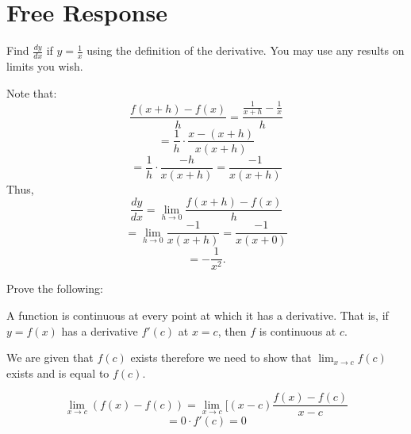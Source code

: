 \section{Free Response}
\begin{questions}

\question[10] Find $\frac{dy}{dx}$ if $y = \frac{1}{x}$ using the
    definition of the derivative. You may use any results on limits
    you wish.

    \begin{solution}
        Note that:
        $$\frac{ f(x+h) - f(x) }{ h } = \frac{ \frac{1}{x+h}
          - \frac{1}{x} }{h}$$
        $$= \frac{1}{h} \cdot \frac{x - (x + h)}{x(x+h)}$$
        $$= \frac{1}{h} \cdot \frac{-h}{x(x+h)} = \frac{-1}{x(x+h)}$$
        Thus,
        $$\frac{dy}{dx} = \lim_{h \to 0} \frac{f(x+h) - f(x)}{h} $$
        $$ = \lim_{h \to 0} \frac{-1}{x(x+h)} = \frac{-1}{x(x+0)} $$
        $$ = -\frac{1}{x^2}.$$
    \end{solution}

\question[10] Prove the following:
              \begin{theorem}
                  A function is continuous at every point at which it
                  has a derivative. That is, if $y = f(x)$ has a
                  derivative $f'(c)$ at $x = c$, then $f$ is
                  continuous at $c$.
              \end{theorem}

    \begin{solution}
        We are given that $f(c)$ exists therefore we need to show that
        $\lim_{x \to c} f(c)$ exists and is equal to $f(c)$.

        $$\lim_{x \to c} (f(x) - f(c)) = \lim_{x \to c} 
            [(x-c)\frac{f(x) - f(c)}{x - c}$$
        $$= 0 \cdot f'(c) = 0$$
    \end{solution}



\end{questions}
